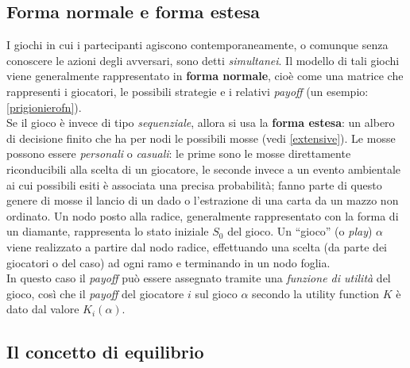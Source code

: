 \subsection{Forma normale e forma estesa}
I giochi in cui i partecipanti agiscono contemporaneamente, o comunque senza conoscere le azioni degli avversari, sono detti \emph{simultanei}.
Il modello di tali giochi viene generalmente rappresentato in \textbf{forma normale}, cioè come una matrice che rappresenti i giocatori, le possibili strategie e i relativi \emph{payoff} (un esempio: \ref{prigionierofn}).\\
Se il gioco è invece di tipo \emph{sequenziale}, allora si usa la \textbf{forma estesa}: un albero di decisione finito che ha per nodi le possibili mosse (vedi \ref{extensive}).
Le mosse possono essere \emph{personali} o \emph{casuali}: le prime sono le mosse direttamente riconducibili alla scelta di un giocatore, le seconde invece a un evento ambientale ai cui possibili esiti è associata una precisa probabilità; fanno parte di questo genere di mosse il lancio di un dado o l'estrazione di una carta da un mazzo non ordinato.
Un nodo posto alla radice, generalmente rappresentato con la forma di un diamante, rappresenta lo stato iniziale $S_0$ del gioco.
Un ``gioco'' (o \emph{play}) $\alpha$ viene realizzato a partire dal nodo radice, effettuando una scelta (da parte dei giocatori o del caso) ad ogni ramo e terminando in un nodo foglia.\\
In questo caso il \emph{payoff} può essere assegnato tramite una \emph{funzione di utilità} del gioco, così che il \emph{payoff} del giocatore $i$ sul gioco $\alpha$ secondo la utility function $K$ è dato dal valore $K_i(\alpha)$. \cite{frank}

\subsection{Il concetto di equilibrio}


